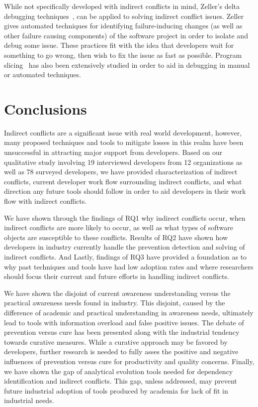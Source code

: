 \documentclass[conference]{IEEEtran}
\begin{document}
While not specifically developed with indirect conflicts in mind, Zeller's delta debugging techniques~\cite{Zeller:2005:WPF}, 
can be applied to solving indirect conflict issues. Zeller gives automated techniques for identifying failure-inducing
changes (as well as other failure causing components) of the software project in order to isolate and debug some issue. These practices fit
with the idea that developers wait for something to go wrong, then wish to fix the issue as fast as possible. Program slicing~\cite{Xu:2005:BSP}
has also been extensively studied in order to aid in debugging in manual or automated techniques.

\section{Conclusions}
\label{sec:conc}

Indirect conflicts are a significant issue with real world development, however, many proposed techniques and tools to mitigate
losses in this realm have been unsuccessful in attracting major support from developers. Based on our qualitative study involving
19 interviewed developers from 12 organizations as well as 78 surveyed developers, we have provided characterization of indirect conflicts,
current developer work flow surrounding indirect conflicts, and what direction any future tools should follow in order to aid developers
in their work flow with indirect conflicts.

We have shown through the findings of RQ1 why indirect conflicts occur, when indirect conflicts are more likely to
occur, as well as what types of software objects are susceptible to these conflicts. Results of RQ2 have shown
how developers in industry currently handle the prevention detection and solving of indirect conflicts. And Lastly, findings of RQ3
have provided a foundation as to why past techniques and tools have had low adoption rates and where
researchers should focus their current and future efforts in handling indirect conflicts. 

We have shown the disjoint of current awareness understanding versus the practical
awareness needs found in industry. This disjoint, caused by the difference of academic and practical understanding in awareness needs,
ultimately lead to tools with information overload and false positive issues. The debate of prevention versus cure has been presented along with
the industrial tendency towards curative measures. While a curative approach may be favored by developers, further research is needed
to fully asses the positive and negative influences of prevention versus cure for productivity and quality concerns. Finally, we have shown
the gap of analytical evolution tools needed for dependency identification and indirect conflicts. This gap, unless addressed, may prevent
future industrial adoption of tools produced by academia for lack of fit in industrial needs.
\end{document}
